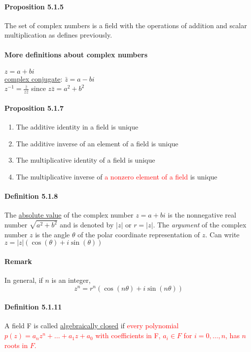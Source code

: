 \documentclass[11pt]{article}
\newcommand{\ti}[1]{\textit{#1}}
\newcommand{\under}[1]{\underline{#1}}
\begin{document}
{\paragraph{Proposition 5.1.5} The set of complex numbers is a field with the operations of addition and scalar multiplication as defines previously.
\paragraph{More definitions about complex numbers}
$z = a + bi$\\
\under{complex conjugate}: $\bar{z} = a - bi$\\
$z^{-1} = \frac{\bar{z}}{z\bar{z}}$ since $z\bar{z} = a^2 + b^2$
\paragraph{Proposition 5.1.7}
\begin{enumerate}
	\item The additive identity in a field is unique
	\item The additive inverse of an element of a field is unique
	\item The multiplicative identity of a field is unique
	\item The multiplicative inverse of \textcolor{red}{a nonzero element of a field} is unique
\end{enumerate}
\paragraph{Definition 5.1.8}
The \under{absolute value} of the complex number $z = a+bi$ is the nonnegative real number $\sqrt{a^2 + b^2}$ and is denoted by $|z|$ or $r = |z|$. The \ti{argument} of the complex number $z$ is the angle $\theta$ of the polar coordinate representation of $z$. Can write $z = |z|(\cos (\theta) + i\sin(\theta))$
\paragraph{Remark}
In general, if $n$ is an integer,
$$z^n = r^n(\cos(n\theta) + i\sin(n\theta))$$ 
\paragraph{Definition 5.1.11}
A field F is called \under{algebraically closed} if \textcolor{red}{every polynomial $p(z) = a_nz^n + \hdots + a_1z + a_0$ with coefficients in F, $a_i \in F$ for $i = 0,\hdots,n$, has $n$ roots in $F$.}

}
\end{document}
